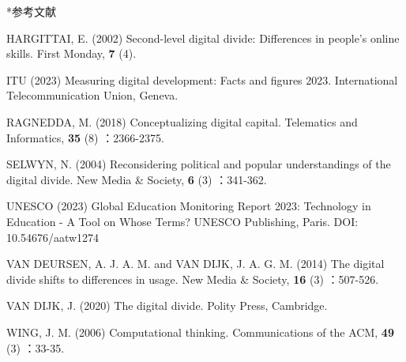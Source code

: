 \documentclass[a4paper,10pt,twocolumn]{ltjsarticle}
\makeatletter
\renewcommand{\section}{\@startsection{section}{1}{\z@}{1.1\Cvs \@plus.4\Cdp \@minus.2\Cdp}{.5\Cvs \@plus.2\Cdp}{\normalfont\gtfamily\bfseries\large}}
\makeatother
\begin{document}
\section*{参考文献}
\begingroup\scriptsize\raggedright{} 
\begin{list}{}{\setlength{\leftmargin}{1.5\zw}\setlength{\itemindent}{-1.5\zw}\setlength{\labelwidth}{0pt}\setlength{\labelsep}{0pt}\setlength{\itemsep}{1pt}\setlength{\parsep}{0pt}\setlength{\topsep}{0pt}\setlength{\listparindent}{0pt}}
\item HARGITTAI, E. (2002) Second-level digital divide: Differences in people's online skills. First Monday, \textbf{7} (4).
\item ITU (2023) Measuring digital development: Facts and figures 2023. International Telecommunication Union, Geneva.
\item RAGNEDDA, M. (2018) Conceptualizing digital capital. Telematics and Informatics, \textbf{35} (8) ：2366-2375.
\item SELWYN, N. (2004) Reconsidering political and popular understandings of the digital divide. New Media \& Society, \textbf{6} (3) ：341-362.
\item UNESCO (2023) Global Education Monitoring Report 2023: Technology in Education - A Tool on Whose Terms? UNESCO Publishing, Paris. DOI: 10.54676/aatw1274
\item VAN DEURSEN, A. J. A. M. and VAN DIJK, J. A. G. M. (2014) The digital divide shifts to differences in usage. New Media \& Society, \textbf{16} (3) ：507-526.
\item VAN DIJK, J. (2020) The digital divide. Polity Press, Cambridge.
\item WING, J. M. (2006) Computational thinking. Communications of the ACM, \textbf{49} (3) ：33-35.
\end{list}\endgroup
\end{document}
